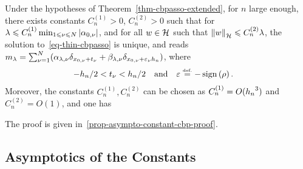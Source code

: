 \begin{cor}\label{cor-cbp-extended}
  Under the hypotheses of Theorem~\ref{thm-cbpasso-extended}, for $n$ large enough, there exists constants $C^{(1)}_n>0$, $C^{(2)}_n>0$ such that 
  for $\lambda\leqslant C^{(1)}_n \min_{1\leqslant \nu\leqslant N} |\alpha_{0,\nu}|$, and for all $w\in \mathcal{H}$ such that $\left\lVert w \right\rVert_{\mathcal{H}}\leqslant C^{(2)}_n \lambda$, the solution to~\eqref{eq-thin-cbpasso} is unique, and reads $m_\lambda=\sum_{\nu=1}^N (\alpha_{\lambda,\nu}\delta_{x_{0,\nu}+t_\nu}  + \beta_{\lambda,\nu}\delta_{x_{0,\nu}+\varepsilon_\nu{h_n}})$, where 
\begin{align*}
-{h_n}/2<t_\nu<{h_n}/2 \quad \text{and} \quad \varepsilon&\stackrel{\mbox{\upshape\tiny def.}}{=} -\operatorname{sign}\left(\rho\right).
  \end{align*}
  Moreover, the constants $C^{(1)}_n, C^{(2)}_n$ can be chosen as $C^{(1)}_n=O({h_n}^3)$ and $C^{(2)}_n=O(1)$, and one has
\end{cor}
The proof is given in~\ref{prop-asympto-constant-cbp-proof}.

\subsection{Asymptotics of the Constants}

